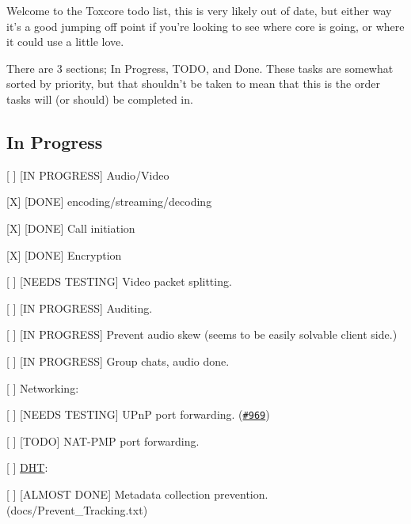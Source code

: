 Welcome to the Toxcore todo list, this is very likely out of date, but either way it's a good jumping off point if you're looking to see where core is going, or where it could use a little love.

There are 3 sections; In Progress, T\+O\+D\+O, and Done. These tasks are somewhat sorted by priority, but that shouldn't be taken to mean that this is the order tasks will (or should) be completed in.

\subsection*{In Progress}


\begin{DoxyItemize}
\item \mbox{[} \mbox{]} \mbox{[}I\+N P\+R\+O\+G\+R\+E\+S\+S\mbox{]} Audio/\+Video
\begin{DoxyItemize}
\item \mbox{[}X\mbox{]} \mbox{[}D\+O\+N\+E\mbox{]} encoding/streaming/decoding
\item \mbox{[}X\mbox{]} \mbox{[}D\+O\+N\+E\mbox{]} Call initiation
\item \mbox{[}X\mbox{]} \mbox{[}D\+O\+N\+E\mbox{]} Encryption
\item \mbox{[} \mbox{]} \mbox{[}N\+E\+E\+D\+S T\+E\+S\+T\+I\+N\+G\mbox{]} Video packet splitting.
\item \mbox{[} \mbox{]} \mbox{[}I\+N P\+R\+O\+G\+R\+E\+S\+S\mbox{]} Auditing.
\item \mbox{[} \mbox{]} \mbox{[}I\+N P\+R\+O\+G\+R\+E\+S\+S\mbox{]} Prevent audio skew (seems to be easily solvable client side.)
\item \mbox{[} \mbox{]} \mbox{[}I\+N P\+R\+O\+G\+R\+E\+S\+S\mbox{]} Group chats, audio done.
\end{DoxyItemize}
\item \mbox{[} \mbox{]} Networking\+:
\begin{DoxyItemize}
\item \mbox{[} \mbox{]} \mbox{[}N\+E\+E\+D\+S T\+E\+S\+T\+I\+N\+G\mbox{]} U\+Pn\+P port forwarding. (\href{https://github.com/irungentoo/toxcore/pull/969}{\tt \#969})
\item \mbox{[} \mbox{]} \mbox{[}T\+O\+D\+O\mbox{]} N\+A\+T-\/\+P\+M\+P port forwarding.
\end{DoxyItemize}
\item \mbox{[} \mbox{]} \hyperlink{struct_d_h_t}{D\+H\+T}\+:
\begin{DoxyItemize}
\item \mbox{[} \mbox{]} \mbox{[}A\+L\+M\+O\+S\+T D\+O\+N\+E\mbox{]} Metadata collection prevention. (docs/\+Prevent\+\_\+\+Tracking.\+txt)

\end{DoxyItemize}
\end{DoxyItemize}
